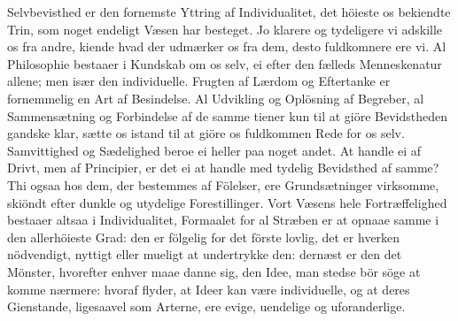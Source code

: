 \documentclass[12pt,a4paper]{article}
\newcommand{\opage}[1]{\marginnote{\footnotesize\textit{[#1]}}}
\begin{document}
\opage{235} Selvbevisthed er den fornemste Yttring af Individualitet, det höieste os
bekiendte Trin, som noget endeligt Væsen har besteget. Jo klarere og
tydeligere vi adskille os fra andre, kiende hvad der udmærker os fra dem,
desto fuldkomnere ere vi. Al Philosophie bestaaer i Kundskab om os selv,
ei efter den fælleds Menneskenatur allene; men især den individuelle.
Frugten af Lærdom og Eftertanke er fornemmelig en Art af Besindelse. Al
Udvikling og Oplösning af Begreber, al Sammensætning og Forbindelse af de
samme tiener kun til at giöre Bevidstheden gandske klar, sætte os istand
til at giöre os fuldkommen Rede for os selv. Samvittighed og Sædelighed
beroe ei heller paa noget andet. At handle ei af Drivt, men af Principier,
er det ei at handle med tydelig Bevidsthed af samme? Thi ogsaa hos dem, der
bestemmes af Fölelser, ere Grundsætninger virksomme, skiöndt efter dunkle
og utydelige Forestillinger. Vort Væsens hele Fortræffelighed bestaaer
altsaa i Individualitet, Formaalet for al Stræben er at opnaae samme i den
allerhöieste Grad: den er fölgelig for det förste lovlig, det er hverken
nödvendigt, nyttigt eller mueligt at undertrykke den: dernæst er den det
Mönster, hvorefter enhver maae danne sig, den Idee, man stedse bör söge at
komme nærmere: hvoraf flyder, at Ideer kan være individuelle, og at deres
Gienstande, ligesaavel som Arterne, ere evige, uendelige og uforanderlige.
\end{document}
